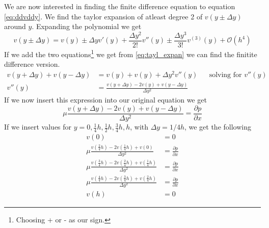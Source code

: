\documentclass[10pt, a4paper]{amsart}
\begin{document}
We are now interested in finding the finite difference equation to equation \ref{eq:ddvddy}. We find the taylor expansion of atleast degree 2 of $v(y\pm \Delta y)$ around $y$. Expanding the polynomial we get 
\begin{equation}\label{eq:tayl_expan}
v(y\pm \Delta y) = v(y) \pm \Delta y v'(y) + \frac{\Delta y^2}{2!} v''(y) \pm \frac{\Delta y^3}{3!}v^{(3)}(y) + \mathcal{O}(h^4)
\end{equation}
If we add the two equations\footnote{Choosing + or - as our sign.} we get from \ref{eq:tayl_expan} we can find the finitite difference version. 
\begin{align}
v(y + \Delta y) + v(y - \Delta y) &= v(y) + v(y) + \Delta y^2 v''(y) && \text{solving for $v''(y)$}\\
v''(y) &= \frac{v(y+\Delta y) - 2v(y) + v(y-\Delta y)}{\Delta y^2}\label{eq:diff_disc}
\end{align}
If we now insert this expression into our original equation we get 
\begin{equation}
\mu \frac{v(y+\Delta y) - 2v(y) + v(y-\Delta y)}{\Delta y^2} = \frac{\partial p}{\partial x}\label{eq:taylor_exp_ins}
\end{equation}
If we insert values for $y = 0, \frac{1}{4}h, \frac{1}{2}h, \frac{3}{4}h, h$, with $\Delta y = 1/4h$, we get the following
\begin{align*}
v(0) &= 0\\
\mu \frac{v(\frac{2}{4}h) - 2v(\frac{1}{4}h) + v(0)}{\Delta y^2} &= \frac{\partial p}{\partial x}\\
\mu \frac{v(\frac{3}{4}h) - 2v(\frac{2}{4}h) + v(\frac{1}{4}h)}{\Delta y^2} &= \frac{\partial p}{\partial x}\\
\mu \frac{v(\frac{4}{4}h) - 2v(\frac{3}{4}h) + v(\frac{2}{4}h)}{\Delta y^2} &= \frac{\partial p}{\partial x}\\
v(h) &= 0
\end{align*}
\end{document}
